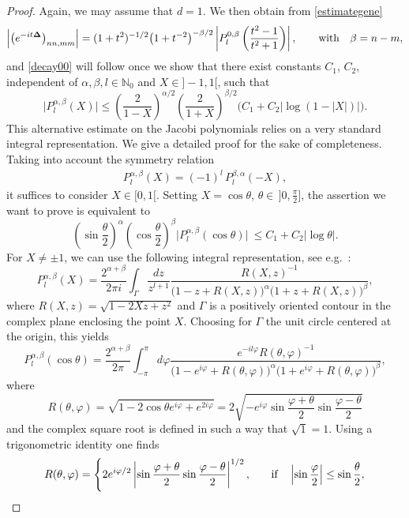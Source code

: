 \documentclass[pdftex]{sigma}
\begin{document}
\begin{proof}
Again, we may assume that $d=1$. We then obtain from \eqref{estimategene}
\[
\left|\left(e^{-it{\bf\Delta}}\right)_{nn,mm}\right|
 = (1+t^2)^{-1/2}
\big(1+t^{-2}\big)^{-\beta/2}
\left|P_l^{0,\beta}\left(\frac{t^2-1}{t^2+1}\right)\right|,\qquad \mbox{with} \quad \beta=n-m ,
\]
and \eqref{decay00} will follow once we show that
there exist constants $C_1$, $C_2$, independent of $\alpha,\beta, l\in\mathbb
N_0$ and $X\in]-1,1[$, such that
\[
\big|P_l^{\alpha,\beta}(X)\big|\leq  \left(\frac2{1-X}\right)^{\alpha/2}
\left(\frac2{1+X}\right)^{\beta/2} \big(C_1 +
C_2\big|\log(1-|X|)\big|\big)  .
\]
This alternative estimate on the Jacobi
polynomials relies on a very standard integral representation. We give a
detailed proof for the sake of completeness.
Taking into account the symmetry
relation
\begin{gather*}
P_l^{\alpha,\beta}(X)  =  (-1)^l\,P_l^{\beta,\alpha}(-X) ,
\end{gather*}
 it suf\/f\/ices to
  consider $X\in [0,1[$.
Setting $X=\cos\theta$, $\theta\in\, ]0,\frac{\pi}{2}]$,
the assertion we want to prove is equivalent to
\[
\left(\sin\frac\theta2\right)^\alpha \left(\cos\frac\theta2\right)^\beta
\big|P_l^{\alpha,\beta}(\cos\theta)\big|\ \leq  C_1 + C_2 |\log\theta | .
\]
For $X\ne\pm1$, we can use the following integral representation, see e.g.~\cite[p. 70]{Szego}:
\[
P_l^{\alpha,\beta}(X)=\frac{2^{\alpha+\beta}}{2\pi i}
\int_\Gamma\frac{dz}{z^{l+1}} \frac{R(X,z)^{-1}}
{\big(1-z+R(X,z)\big)^\alpha\big(1+z+R(X,z)\big)^\beta} ,
\]
where $R(X,z)=\sqrt{1-2Xz+z^2}$ and $\Gamma$ is a positively oriented
contour in the complex plane enclosing the point $X$. Choosing
for $\Gamma$ the unit circle centered at the origin, this yields
\[
P_l^{\alpha,\beta}(\cos\theta)=\frac{2^{\alpha+\beta}}{2\pi}
\int_{-\pi}^\pi d\varphi \frac{e^{-il\varphi} R(\theta,\varphi)^{-1}}
{\big(1-e^{i\varphi}+R(\theta,\varphi)\big)^\alpha\big(1+e^{i\varphi}+R(\theta,\varphi)\big)^\beta} ,
\]
where
\[
R(\theta,\varphi)=\sqrt{1-2\cos\theta e^{i\varphi}+e^{2i\varphi}}=
2\sqrt{-e^{i\varphi} \sin\frac{\varphi+\theta}2 \sin\frac{\varphi-\theta}2}
\]
and the complex square root is def\/ined in such a way  that
$\sqrt1=1$. Using a trigonometric identity one f\/inds
\[
R(\theta,\varphi)=\begin{cases}
\displaystyle 2 e^{i\varphi/2} \left|\sin\frac{\varphi+\theta}2 \sin\frac{\varphi-\theta}2\right|^{1/2}, \quad  &
\displaystyle  \mbox{if}\quad \left|\sin\frac\varphi2\right|\leq\sin\frac\theta2 ,\vspace{1mm}\\

\end{cases}\]
\end{proof}
\end{document}
